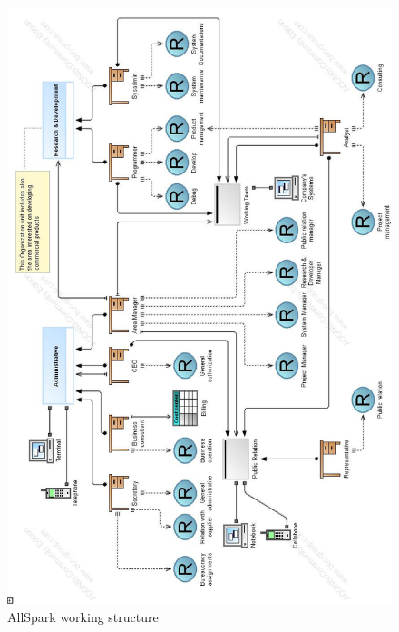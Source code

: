 \begin{figure}
\begin{centering}
\includegraphics[scale=0.45]{assign2/adonis/imgs/working_structure.jpg}
\caption{AllSpark working structure}
\label{2img:working}
\end{centering}
\end{figure}

